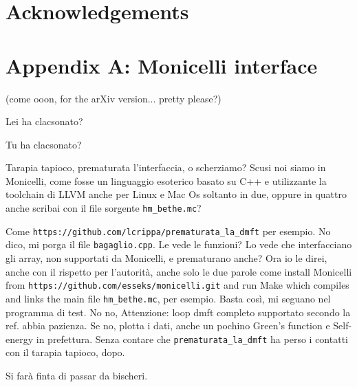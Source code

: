 \documentclass[preprint,3p,10pt]{elsarticle}
\begin{document}

\section*{Acknowledgements}

\section{Appendix A: Monicelli interface}

(come ooon, for the arXiv version... pretty please?)

Lei ha clacsonato?

Tu ha clacsonato?

Tarapia tapioco, prematurata l'interfaccia, o scherziamo? Scusi noi siamo in Monicelli, come fosse un linguaggio esoterico basato su C++ e utilizzante la toolchain di LLVM anche per Linux e Mac Os soltanto in due, oppure in quattro anche scribai con il file sorgente {\tt hm\_bethe.mc}? 

Come {\tt https://github.com/lcrippa/prematurata\_la\_dmft} per esempio. No dico, mi porga il file {\tt bagaglio.cpp}. Le vede le funzioni? Lo vede che interfacciano gli array, non supportati da Monicelli, e prematurano anche?
Ora io le direi, anche con il rispetto per l'autorità, anche solo le due parole come install Monicelli from {\tt https://github.com/esseks/monicelli.git} and run Make which compiles and links the main file {\tt hm\_bethe.mc}, per esempio. Basta così, mi seguano nel programma di test. No no, Attenzione: loop dmft completo supportato secondo la ref. \cite{EDIpack} abbia pazienza. Se no, plotta i dati, anche un pochino Green's function e Self-energy in prefettura. Senza contare che {\tt prematurata\_la\_dmft} ha perso i contatti con il tarapia tapioco, dopo.

Si farà finta di passar da bischeri.



\end{document}
